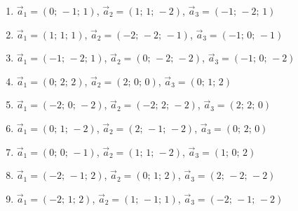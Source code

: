 \begin{enumerate}[label=\arabic*., leftmargin=*]
\item $\vec a_1=(0;\,-1;\,1)$, $\vec a_2=(1;\,1;\,-2)$, $\vec a_3=(-1;\,-2;\,1)$
\item $\vec a_1=(1;\,1;\,1)$, $\vec a_2=(-2;\,-2;\,-1)$, $\vec a_3=(-1;\,0;\,-1)$
\item $\vec a_1=(-1;\,-2;\,1)$, $\vec a_2=(0;\,-2;\,-2)$, $\vec a_3=(-1;\,0;\,-2)$
\item $\vec a_1=(0;\,2;\,2)$, $\vec a_2=(2;\,0;\,0)$, $\vec a_3=(0;\,1;\,2)$
\item $\vec a_1=(-2;\,0;\,-2)$, $\vec a_2=(-2;\,2;\,-2)$, $\vec a_3=(2;\,2;\,0)$
\item $\vec a_1=(0;\,1;\,-2)$, $\vec a_2=(2;\,-1;\,-2)$, $\vec a_3=(0;\,2;\,0)$
\item $\vec a_1=(0;\,0;\,-1)$, $\vec a_2=(1;\,1;\,-2)$, $\vec a_3=(1;\,0;\,2)$
\item $\vec a_1=(-2;\,-1;\,2)$, $\vec a_2=(0;\,1;\,2)$, $\vec a_3=(2;\,-2;\,-2)$
\item $\vec a_1=(-2;\,1;\,2)$, $\vec a_2=(1;\,-1;\,1)$, $\vec a_3=(-2;\,-1;\,-2)$
\end{enumerate}

